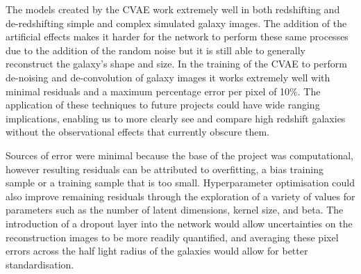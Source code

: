 \documentclass[fleqn,usenatbib]{mnras}
\begin{document}
The models created by the CVAE work extremely well in both redshifting and de-redshifting simple and complex simulated galaxy images. The addition of the artificial effects makes it harder for the network to perform these same processes due to the addition of the random noise but it is still able to generally reconstruct the galaxy's shape and size. In the training of the CVAE to perform de-noising and de-convolution of galaxy images it works extremely well with minimal residuals and a maximum percentage error per pixel of 10\%. The application of these techniques to future projects could have wide ranging implications, enabling us to more clearly see and compare high redshift galaxies without the observational effects that currently obscure them.

Sources of error were minimal because the base of the project was computational, however resulting residuals can be attributed to overfitting, a bias training sample or a training sample that is too small. Hyperparameter optimisation could also improve remaining residuals through the exploration of a variety of values for parameters such as the number of latent dimensions, kernel size, and beta. The introduction of a dropout layer into the network would allow uncertainties on the reconstruction images to be more readily quantified, and averaging these pixel errors across the half light radius of the galaxies would allow for better standardisation. 


 





\end{document}
